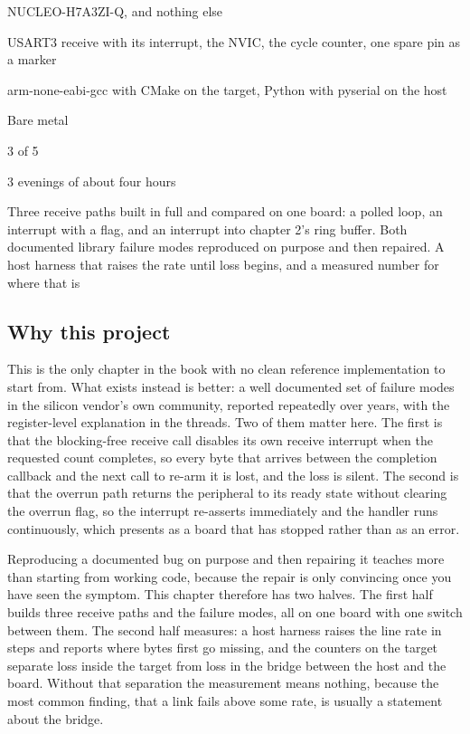 
\begin{keyfacts}
\item[Board] NUCLEO-H7A3ZI-Q, and nothing else
\item[Peripherals] USART3 receive with its interrupt, the NVIC, the cycle counter, one spare pin as a marker
\item[Toolchain] arm-none-eabi-gcc with CMake on the target, Python with pyserial on the host
\item[Operating system] Bare metal
\item[Difficulty] 3 of 5
\item[Effort] 3 evenings of about four hours
\item[Deliverable] Three receive paths built in full and compared on one board: a polled loop, an interrupt with a flag, and an interrupt into chapter 2's ring buffer. Both documented library failure modes reproduced on purpose and then repaired. A host harness that raises the rate until loss begins, and a measured number for where that is
\end{keyfacts}

\subsection*{Why this project}

This is the only chapter in the book with no clean reference implementation to
start from. What exists instead is better: a well documented set of failure
modes in the silicon vendor's own community, reported repeatedly over years,
with the register-level explanation in the threads. Two of them matter here.
The first is that the blocking-free receive call disables its own receive
interrupt when the requested count completes, so every byte that arrives between
the completion callback and the next call to re-arm it is lost, and the loss is
silent. The second is that the overrun path returns the peripheral to its ready
state without clearing the overrun flag, so the interrupt re-asserts
immediately and the handler runs continuously, which presents as a board that
has stopped rather than as an error.

Reproducing a documented bug on purpose and then repairing it teaches more than
starting from working code, because the repair is only convincing once you have
seen the symptom. This chapter therefore has two halves. The first half builds
three receive paths and the failure modes, all on one board with one switch
between them. The second half measures: a host harness raises the line rate in
steps and reports where bytes first go missing, and the counters on the target
separate loss inside the target from loss in the bridge between the host and the
board. Without that separation the measurement means nothing, because the most
common finding, that a link fails above some rate, is usually a statement about
the bridge.


